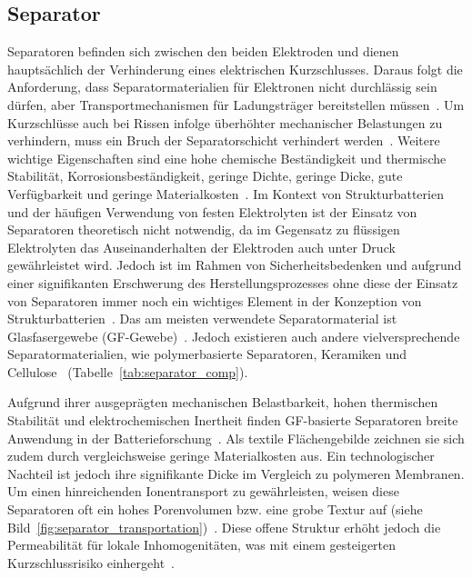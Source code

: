 \subsection{Separator}

Separatoren befinden sich zwischen den beiden Elektroden und dienen hauptsächlich der Verhinderung eines elektrischen Kurzschlusses. Daraus folgt die Anforderung, dass Separatormaterialien für Elektronen nicht durchlässig sein dürfen, aber Transportmechanismen für Ladungsträger bereitstellen müssen~\cite{Kurzweil2015}. Um Kurzschlüsse auch bei Rissen infolge überhöhter mechanischer Belastungen zu verhindern, muss ein Bruch der Separatorschicht verhindert werden~\cite{Asp2015}. Weitere wichtige Eigenschaften sind eine hohe chemische Beständigkeit und thermische Stabilität, Korrosionsbeständigkeit, geringe Dichte, geringe Dicke, gute Verfügbarkeit und geringe Materialkosten~\cite{Beard2019}. Im Kontext von Strukturbatterien und der häufigen Verwendung von festen Elektrolyten ist der Einsatz von Separatoren theoretisch nicht notwendig, da im Gegensatz zu flüssigen Elektrolyten das Auseinanderhalten der Elektroden auch unter Druck gewährleistet wird. Jedoch ist im Rahmen von Sicherheitsbedenken und aufgrund einer signifikanten Erschwerung des Herstellungsprozesses ohne diese der Einsatz von Separatoren immer noch ein wichtiges Element in der Konzeption von Strukturbatterien~\cite{Asp2015, Hubert2022}. Das am meisten verwendete Separatormaterial ist Glasfasergewebe (GF-Gewebe)~\cite{Zhou2022}. Jedoch existieren auch andere vielversprechende Separatormaterialien, wie polymerbasierte Separatoren, Keramiken und Cellulose~\cite{Simon2008, Greenhalgh2023, Chaudhary2024a} (Tabelle~\ref{tab:separator_comp}).



Aufgrund ihrer ausgeprägten mechanischen Belastbarkeit, hohen thermischen Stabilität und elektrochemischen Inertheit finden GF-basierte Separatoren breite Anwendung in der Batterieforschung~\cite{Luo2015, Asp2019, Asp2021, Liu2022}. Als textile Flächengebilde zeichnen sie sich zudem durch vergleichsweise geringe Materialkosten aus. Ein technologischer Nachteil ist jedoch ihre signifikante Dicke im Vergleich zu polymeren Membranen. Um einen hinreichenden Ionentransport zu gewährleisten, weisen diese Separatoren oft ein hohes Porenvolumen bzw. eine grobe Textur auf (siehe Bild~\ref{fig:separator_transportation})~\cite{Danzi2021}. Diese offene Struktur erhöht jedoch die Permeabilität für lokale Inhomogenitäten, was mit einem gesteigerten Kurzschlussrisiko einhergeht~\cite{Zhou2022}.

